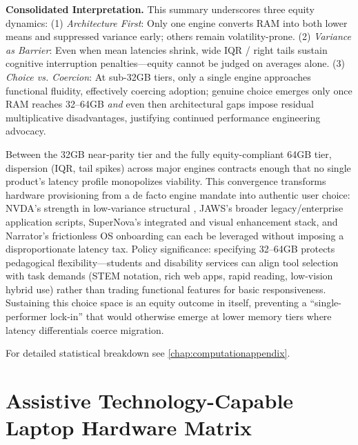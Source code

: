 \noindent\textbf{Consolidated Interpretation.} This summary underscores three equity dynamics: (1) \emph{Architecture First}: Only one engine converts RAM into both lower means and suppressed variance early; others remain volatility-prone. (2) \emph{Variance as Barrier}: Even when mean latencies shrink, wide IQR / right tails sustain cognitive interruption penalties—equity cannot be judged on averages alone. (3) \emph{Choice vs. Coercion}: At sub-32GB tiers, only a single engine approaches functional fluidity, effectively coercing adoption; genuine choice emerges only once RAM reaches 32–64GB \emph{and} even then architectural gaps impose residual multiplicative disadvantages, justifying continued performance engineering advocacy.

Between the 32GB near-parity tier and the fully equity-compliant 64GB tier, dispersion (IQR, tail spikes) across major  engines contracts enough that no single product’s latency profile monopolizes viability. This convergence transforms hardware provisioning from a de facto engine mandate into authentic user choice: NVDA’s strength in low-variance structural , JAWS’s broader legacy/enterprise application scripts, SuperNova’s integrated  and visual enhancement stack, and Narrator’s frictionless OS onboarding can each be leveraged without imposing a disproportionate latency tax. Policy significance: specifying 32–64GB  protects pedagogical flexibility—students and disability services can align tool selection with task demands (STEM notation, rich web apps, rapid reading, low-vision hybrid use) rather than trading functional features for basic responsiveness. Sustaining this choice space is an equity outcome in itself, preventing a “single-performer lock-in” that would otherwise emerge at lower memory tiers where latency differentials coerce migration.

For detailed statistical breakdown see \ref{chap:computationappendix}.

\section{Assistive Technology-Capable Laptop Hardware Matrix}\label{sec:assistive-laptop-matrix}


